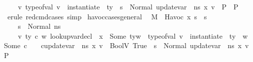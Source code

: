 \begin{isabellebody}
\ \ \ \ {\isasymAnd}v{\isachardot}{\kern0pt}\ type{\isacharunderscore}{\kern0pt}of{\isacharunderscore}{\kern0pt}val\ v\ {\isacharequal}{\kern0pt}\ instantiate\ {\isasymOmega}\ ty\ {\isasymLongrightarrow}\ s{\isacharprime}{\kern0pt}\ {\isacharequal}{\kern0pt}\ Normal\ {\isacharparenleft}{\kern0pt}update{\isacharunderscore}{\kern0pt}var\ {\isasymLambda}\ n{\isacharunderscore}{\kern0pt}s\ x\ v{\isacharparenright}{\kern0pt}\ {\isasymLongrightarrow}\ P{\isasymrbrakk}\ {\isasymLongrightarrow}\ P{\isachardoublequoteclose}\isanewline
%
\isadelimproof
\ \ %
\endisadelimproof
%
\isatagproof
{}\isamarkupfalse%
\ {\isacharparenleft}{\kern0pt}erule\ red{\isacharunderscore}{\kern0pt}cmd{\isachardot}{\kern0pt}cases{\isacharsemicolon}{\kern0pt}\ simp{\isacharparenright}{\kern0pt}%
\endisatagproof
{\isafoldproof}%
%
\isadelimproof
\isanewline
%
\endisadelimproof
\isanewline
{}\isamarkupfalse%
\ havoc{\isacharunderscore}{\kern0pt}cases{\isacharunderscore}{\kern0pt}general{\isacharcolon}{\kern0pt}\isanewline
\ \ {\isachardoublequoteopen}{\isasymlbrakk}M{\isacharcomma}{\kern0pt}{\isasymLambda}{\isacharcomma}{\kern0pt}{\isasymGamma}{\isacharcomma}{\kern0pt}{\isasymOmega}\ {\isasymturnstile}\ {\isasymlangle}Havoc\ x{\isacharcomma}{\kern0pt}\ s{\isasymrangle}\ {\isasymrightarrow}\ s{\isacharprime}{\kern0pt}{\isacharsemicolon}{\kern0pt}\isanewline
\ \ \ \ s\ {\isacharequal}{\kern0pt}\ Normal\ n{\isacharunderscore}{\kern0pt}s{\isacharsemicolon}{\kern0pt}\isanewline
\ \ \ \ {\isasymAnd}v\ ty\ c\ w{\isachardot}{\kern0pt}\ lookup{\isacharunderscore}{\kern0pt}var{\isacharunderscore}{\kern0pt}decl\ {\isasymLambda}\ x\ {\isacharequal}{\kern0pt}\ Some\ {\isacharparenleft}{\kern0pt}ty{\isacharcomma}{\kern0pt}w{\isacharparenright}{\kern0pt}\ {\isasymLongrightarrow}\ type{\isacharunderscore}{\kern0pt}of{\isacharunderscore}{\kern0pt}val\ v\ {\isacharequal}{\kern0pt}\ instantiate\ {\isasymOmega}\ ty\ {\isasymLongrightarrow}\ {\isacharparenleft}{\kern0pt}w\ {\isacharequal}{\kern0pt}\ Some\ c\ {\isasymLongrightarrow}\ {\isasymLambda}{\isacharcomma}{\kern0pt}{\isasymGamma}{\isacharcomma}{\kern0pt}{\isasymOmega}\ {\isasymturnstile}\ {\isasymlangle}c{\isacharcomma}{\kern0pt}{\isacharparenleft}{\kern0pt}update{\isacharunderscore}{\kern0pt}var\ {\isasymLambda}\ n{\isacharunderscore}{\kern0pt}s\ x\ v{\isacharparenright}{\kern0pt}{\isasymrangle}\ {\isasymDown}\ BoolV\ True{\isacharparenright}{\kern0pt}\ {\isasymLongrightarrow}\ s{\isacharprime}{\kern0pt}\ {\isacharequal}{\kern0pt}\ Normal\ {\isacharparenleft}{\kern0pt}update{\isacharunderscore}{\kern0pt}var\ {\isasymLambda}\ n{\isacharunderscore}{\kern0pt}s\ x\ v{\isacharparenright}{\kern0pt}\ {\isasymLongrightarrow}\ P{\isacharsemicolon}{\kern0pt}\isanewline

\end{isabellebody}
